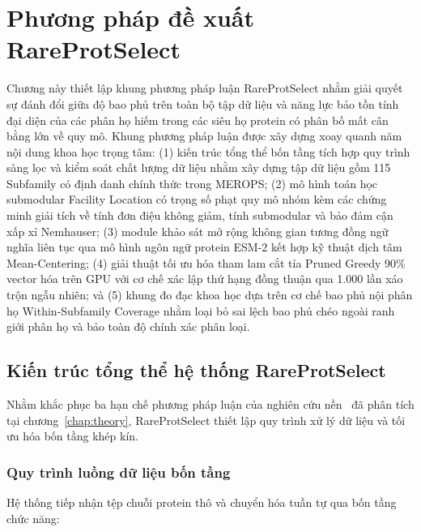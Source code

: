 \chapter{Phương pháp đề xuất RareProtSelect}
\label{chap:methodology}

Chương này thiết lập khung phương pháp luận RareProtSelect nhằm giải quyết sự đánh đổi giữa độ bao phủ trên toàn bộ tập dữ liệu và năng lực bảo tồn tính đại diện của các phân họ hiếm trong các siêu họ protein có phân bố mất cân bằng lớn về quy mô. Khung phương pháp luận được xây dựng xoay quanh năm nội dung khoa học trọng tâm: (1) kiến trúc tổng thể bốn tầng tích hợp quy trình sàng lọc và kiểm soát chất lượng dữ liệu nhằm xây dựng tập dữ liệu gồm 115 Subfamily có định danh chính thức trong MEROPS; (2) mô hình toán học submodular Facility Location có trọng số phạt quy mô nhóm kèm các chứng minh giải tích về tính đơn điệu không giảm, tính submodular và bảo đảm cận xấp xỉ Nemhauser; (3) module khảo sát mở rộng không gian tương đồng ngữ nghĩa liên tục qua mô hình ngôn ngữ protein ESM-2 kết hợp kỹ thuật dịch tâm Mean-Centering; (4) giải thuật tối ưu hóa tham lam cắt tỉa Pruned Greedy 90\% vector hóa trên GPU với cơ chế xác lập thứ hạng đồng thuận qua 1.000 lần xáo trộn ngẫu nhiên; và (5) khung đo đạc khoa học dựa trên cơ chế bao phủ nội phân họ Within-Subfamily Coverage nhằm loại bỏ sai lệch bao phủ chéo ngoài ranh giới phân họ và bảo toàn độ chính xác phân loại.

\section{Kiến trúc tổng thể hệ thống RareProtSelect}
\label{sec:methodology_architecture}

Nhằm khắc phục ba hạn chế phương pháp luận của nghiên cứu nền~\cite{nguyen2025} đã phân tích tại chương~\ref{chap:theory}, RareProtSelect thiết lập quy trình xử lý dữ liệu và tối ưu hóa bốn tầng khép kín.

\subsection{Quy trình luồng dữ liệu bốn tầng}
\label{subsec:four_tier_pipeline}

Hệ thống tiếp nhận tệp chuỗi protein thô và chuyển hóa tuần tự qua bốn tầng chức năng:

